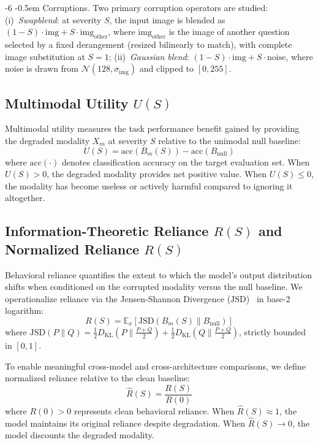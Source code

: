 \documentclass[graybox]{svmult}
\makeatletter
\newcommand{\jsd}{\text{JSD}}
\newcommand{\dkl}{D_{\text{KL}}}
\renewcommand\paragraph{\@startsection{paragraph}{4}{\z@}%
  {-6\p@ \@plus -2\p@ \@minus -2\p@}%
  {-0.5em}%
  {\normalfont\normalsize\bfseries}}
\makeatother
\begin{document}
\paragraph{Corruptions.}
Two primary corruption operators are studied: (i)~\emph{Swapblend}: at severity $S$, the input image is blended as $(1-S)\cdot\text{img} + S\cdot\text{img}_{\text{other}}$, where $\text{img}_{\text{other}}$ is the image of another question selected by a fixed derangement (resized bilinearly to match), with complete image substitution at $S=1$; (ii)~\emph{Gaussian blend}: $(1-S)\cdot\text{img} + S\cdot\text{noise}$, where noise is drawn from $\mathcal{N}(128, \sigma_{\text{img}})$ and clipped to $[0, 255]$.

\subsection{Multimodal Utility $U(S)$}
Multimodal utility measures the task performance benefit gained by providing the degraded modality $X_m$ at severity $S$ relative to the unimodal null baseline:
\begin{equation}
U(S) = \text{acc}(B_m(S)) - \text{acc}(B_{\text{null}})
\end{equation}
where $\text{acc}(\cdot)$ denotes classification accuracy on the target evaluation set.
When $U(S) > 0$, the degraded modality provides net positive value. When $U(S) \le 0$, the modality has become useless or actively harmful compared to ignoring it altogether.

\subsection{Information-Theoretic Reliance $R(S)$ and Normalized Reliance $\hat{R}(S)$}
Behavioral reliance quantifies the extent to which the model's output distribution shifts when conditioned on the corrupted modality versus the null baseline. We operationalize reliance via the Jensen-Shannon Divergence ($\jsd$)~\cite{lin1991divergence} in base-2 logarithm:
\begin{equation}
R(S) = \mathbb{E}_x \left[ \jsd(B_m(S) \parallel B_{\text{null}}) \right]
\end{equation}
where $\jsd(P \parallel Q) = \frac{1}{2} \dkl\left(P \parallel \frac{P+Q}{2}\right) + \frac{1}{2} \dkl\left(Q \parallel \frac{P+Q}{2}\right)$, strictly bounded in $[0, 1]$.

To enable meaningful cross-model and cross-architecture comparisons, we define normalized reliance relative to the clean baseline:
\begin{equation}
\hat{R}(S) = \frac{R(S)}{R(0)}
\end{equation}
where $R(0) > 0$ represents clean behavioral reliance. When $\hat{R}(S) \approx 1$, the model maintains its original reliance despite degradation. When $\hat{R}(S) \to 0$, the model discounts the degraded modality.
\end{document}
